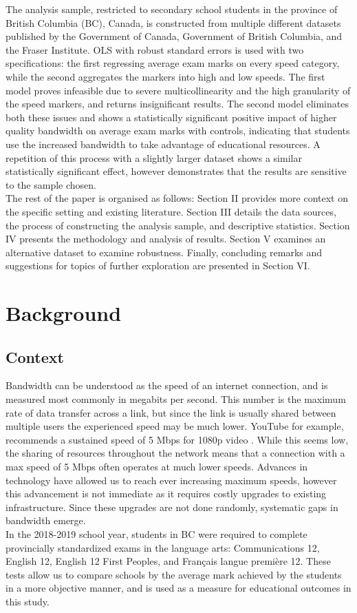 \documentclass[stu, floatsintext]{apa7}
\begin{document}
    The analysis sample, restricted to secondary school students in the province of British Columbia (BC), Canada, is constructed from multiple different datasets published by the Government of Canada, Government of British Columbia, and the Fraser Institute. OLS with robust standard errors is used with two specifications: the first regressing average exam marks on every speed category, while the second aggregates the markers into high and low speeds. The first model proves infeasible due to severe multicollinearity and the high granularity of the speed markers, and returns insignificant results. The second model eliminates both these issues and shows a statistically significant positive impact of higher quality bandwidth on average exam marks with controls, indicating that students use the increased bandwidth to take advantage of educational resources. A repetition of this process with a slightly larger dataset shows a similar statistically significant effect, however demonstrates that the results are sensitive to the sample chosen. \\

    The rest of the paper is organised as follows: Section II provides more context on the specific setting and existing literature. Section III details the data sources, the process of constructing the analysis sample, and descriptive statistics. Section IV presents the methodology and analysis of results. Section V examines an alternative dataset to examine robustness. Finally, concluding remarks and suggestions for topics of further exploration are presented in Section VI. 
    \section{Background}
    \subsection{Context}
    Bandwidth can be understood as the speed of an internet connection, and is measured most commonly in megabits per second. This number is the maximum rate of data transfer across a link, but since the link is usually shared between multiple users the experienced speed may be much lower. YouTube for example, recommends a sustained speed of 5 Mbps for 1080p video \autocite{youtube}. While this seems low, the sharing of resources throughout the network means that a connection with a max speed of 5 Mbps often operates at much lower speeds. Advances in technology have allowed us to reach ever increasing maximum speeds, however this advancement is not immediate as it requires costly upgrades to existing infrastructure. Since these upgrades are not done randomly, systematic gaps in bandwidth emerge. \\
    In the 2018-2019 school year, students in BC were required to complete provincially standardized exams in the language arts: Communications 12, English 12, English 12 First Peoples, and Français langue première 12. These tests allow us to compare schools by the average mark achieved by the students in a more objective manner, and is used as a measure for educational outcomes in this study. 
\end{document}
